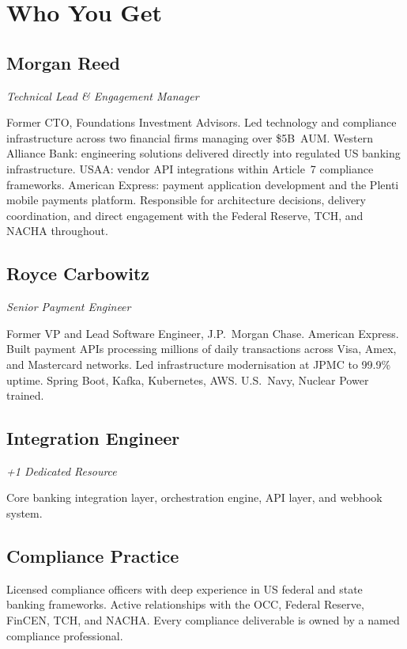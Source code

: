 
\newpage
\section{Who You Get}

\subsection{Morgan Reed}
\textit{Technical Lead \& Engagement Manager}

Former CTO, Foundations Investment Advisors. Led technology and compliance infrastructure across two financial firms managing over \$5B~AUM. Western Alliance Bank: engineering solutions delivered directly into regulated US banking infrastructure. USAA: vendor API integrations within Article~7 compliance frameworks. American Express: payment application development and the Plenti mobile payments platform. Responsible for architecture decisions, delivery coordination, and direct engagement with the Federal Reserve, TCH, and NACHA throughout.

\subsection{Royce Carbowitz}
\textit{Senior Payment Engineer}

Former VP and Lead Software Engineer, J.P.\ Morgan Chase. American Express. Built payment APIs processing millions of daily transactions across Visa, Amex, and Mastercard networks. Led infrastructure modernisation at JPMC to 99.9\% uptime. Spring Boot, Kafka, Kubernetes, AWS. U.S.\ Navy, Nuclear Power trained.

\subsection{Integration Engineer}
\textit{+1 Dedicated Resource}

Core banking integration layer, orchestration engine, API layer, and webhook system.

\subsection{Compliance Practice}

Licensed compliance officers with deep experience in US federal and state banking frameworks. Active relationships with the OCC, Federal Reserve, FinCEN, TCH, and NACHA. Every compliance deliverable is owned by a named compliance professional.
